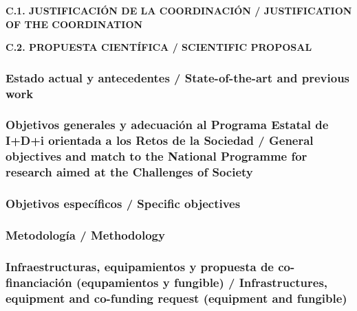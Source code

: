 \documentclass[a4paper,11pt,oneside]{article}
\begin{document}
\vspace{12pt}

\noindent\textbf{C.1. JUSTIFICACIÓN DE LA COORDINACIÓN / JUSTIFICATION OF THE COORDINATION}
\vspace{12pt}



\vspace{12pt}

\noindent\textbf{C.2. PROPUESTA CIENTÍFICA / SCIENTIFIC PROPOSAL}

\subsubsection*{\label{subsubsec:stateoftheart}Estado actual y antecedentes /  State-of-the-art and previous work}




\subsubsection*{Objetivos generales y adecuación al Programa Estatal de I+D+i orientada a los Retos de la Sociedad / General objectives and match to the National Programme for research aimed at the Challenges of Society}


%

\subsubsection*{Objetivos específicos / Specific objectives}
%





\subsubsection*{Metodolog\'ia / Methodology}

%
 

 

\subsubsection*{Infraestructuras, equipamientos y propuesta de co-financiaci\'on (equpamientos y fungible) / Infrastructures, equipment and co-funding request (equipment and fungible)}
\end{document}
